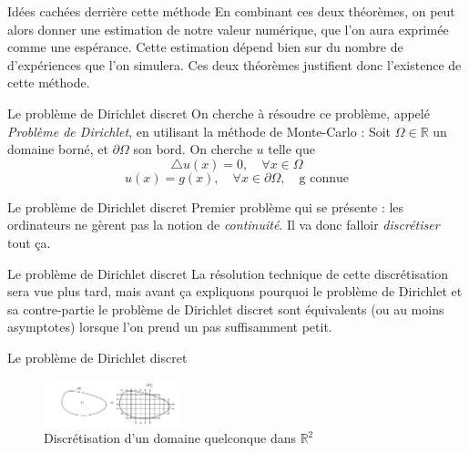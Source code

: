 \documentclass{beamer}
\begin{document}
\begin{frame}{Idées cachées derrière cette méthode}
    En combinant ces deux théorèmes, on peut alors donner une estimation de notre valeur numérique, que l'on aura exprimée comme une espérance.
    \smallbreak
    Cette estimation dépend bien sur du nombre de d'expériences que l'on simulera.
    \smallbreak
    Ces deux théorèmes justifient donc l'existence de cette méthode.
\end{frame}

\begin{frame}{Le problème de Dirichlet discret}
    On cherche à résoudre ce problème, appelé \emph{Problème de Dirichlet}, en utilisant la méthode de Monte-Carlo :
    \smallbreak
    Soit $\Omega \in \mathbb{R}$ un domaine borné, et $\partial\Omega$ son bord. On cherche $u$ telle que
\[\bigtriangleup u(x) = 0, \quad \forall x \in \Omega\]
\[u(x) = g(x), \quad \forall x \in \partial \Omega, \quad \text{g connue}\]
\end{frame}

\begin{frame}{Le problème de Dirichlet discret}
    Premier problème qui se présente : les ordinateurs ne gèrent pas la notion
    de \emph{continuité}. Il va donc falloir \emph{discrétiser} tout ça.
\end{frame}


\begin{frame}{Le problème de Dirichlet discret}
    La résolution technique de cette discrétisation sera vue plus tard, mais
    avant ça expliquons pourquoi le problème de Dirichlet et sa contre-partie
    le problème de Dirichlet discret sont équivalents (ou au moins asymptotes)
    lorsque l'on prend un pas suffisamment petit.
\end{frame}


\begin{frame}{Le problème de Dirichlet discret}
    \begin{figure}[htp]
        \centering
        \includegraphics[width=4cm]{domainediscret}
        \caption{Discrétisation d'un domaine quelconque dans $\mathbb{R}^2$}
        \label{Domaine discret}
    \end{figure}
\end{frame}
\end{document}
